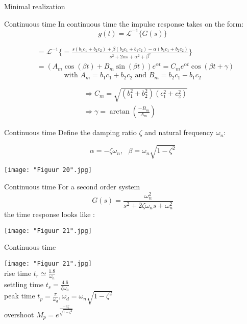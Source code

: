 \begin{subsection}{Minimal realization}
\begin{frame}{Continuous time}
In continuous time the impulse response takes on the form: $$g(t)=\mathcal{L}^{-1}\{G(s)\}$$




\begin{align*}
&=\mathcal{L}^{-1}\{=\frac{s(b_1c_1+b_2c_2)+\beta(b_2c_1+b_1c_2)-\alpha(b_1c_1+b_2c_2)}{s^2+2\alpha s+\alpha^2+\beta^2}\}\\
&=(A_m\cos(\beta t)+B_m\sin(\beta t))e^{\alpha t}=C_me^{\alpha t}\cos(\beta t+\gamma)
\end{align*}
$$\text{with }A_m = b_1c_1 + b_2c_2\text{ and }B_m = b_2c_1-b_1c_2$$

\begin{align*}
&\Rightarrow C_m=\sqrt{(b_1^2+b_2^2)(c_1^2+c_2^2)}\\
&\Rightarrow \gamma =\arctan{(\frac{-B_m}{A_m})}
\end{align*}
\end{frame}

\begin{frame}{Continuous time}
Define the damping ratio $\zeta$ and natural frequency $\omega_n:$

$$\alpha=-\zeta\omega_n,\text{ } \beta= \omega_n\sqrt{1-\zeta^2}$$

\begin{center}
    \texttt{[image: "Figuur 20".jpg]}
\end{center}
\end{frame}

\begin{frame}{Continuous time}
For a second order system
$$G(s)=\frac{\omega_n^2}{s^2+2\zeta\omega_ns+\omega_n^2}$$
the time response looks like :
\begin{center}
        \texttt{[image: "Figuur 21".jpg]}
\end{center}
\end{frame}

\begin{frame}{Continuous time}
\begin{center}
        \texttt{[image: "Figuur 21".jpg]}\\
        rise time $t_r\simeq\frac{1.8}{\omega_n}$\\
        settling time $t_s=\frac{4.6}{\zeta\omega_n}$\\
        peak time $t_p=\frac{\pi}{\omega_d}, 
        \omega_d=\omega_n\sqrt{1-\zeta^2}$\\
        overshoot $M_p=e^{\frac{-\pi\zeta}{\sqrt{1-\zeta^2}}}$\\
\end{center}
\end{frame}


\end{subsection}
